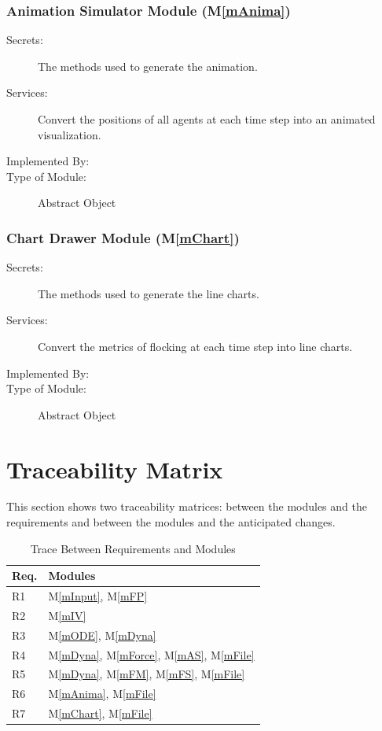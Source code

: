 \documentclass[12pt, titlepage]{article}
\newcommand{\mref}[1]{M\ref{#1}}
\begin{document}
\subsubsection{Animation Simulator Module (\mref{mAnima})}

\begin{description}
\item[Secrets:] The methods used to generate the animation.
\item[Services:] Convert the positions of all agents at each time step into 
an animated visualization.
\item[Implemented By:] \progname{}
\item[Type of Module:] Abstract Object
\end{description}

\subsubsection{Chart Drawer Module (\mref{mChart})}

\begin{description}
\item[Secrets:] The methods used to generate the line charts.
\item[Services:] Convert the metrics of flocking at each time step into 
line charts.
\item[Implemented By:] \progname{}
\item[Type of Module:] Abstract Object
\end{description}

\section{Traceability Matrix} \label{SecTM}

This section shows two traceability matrices: between the modules and the
requirements and between the modules and the anticipated changes.

\begin{table}[H]
\centering
\begin{tabular}{p{} p{}}
\toprule
\textbf{Req.} & \textbf{Modules}\\
\midrule
R1 & \mref{mInput}, \mref{mFP}\\
R2 & \mref{mIV} \\
R3 & \mref{mODE}, \mref{mDyna}\\
R4 & \mref{mDyna}, \mref{mForce}, \mref{mAS}, \mref{mFile}\\
R5 & \mref{mDyna}, \mref{mFM}, \mref{mFS}, \mref{mFile}\\
R6 & \mref{mAnima}, \mref{mFile}\\
R7 & \mref{mChart}, \mref{mFile}\\
\bottomrule
\end{tabular}
\caption{Trace Between Requirements and Modules}
\label{TblRT}
\end{table}
\end{document}
